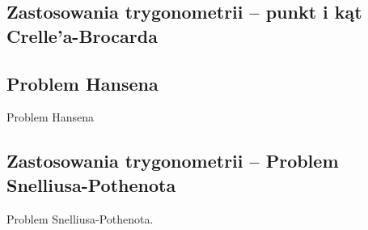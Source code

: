 \subsection{Zastosowania trygonometrii -- punkt i kąt Crelle'a-Brocarda}


\subsection{Problem Hansena}
Problem Hansena
%

\subsection{Zastosowania trygonometrii -- Problem Snelliusa-Pothenota}
Problem Snelliusa-Pothenota.
%



